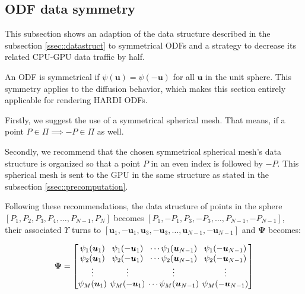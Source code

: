 \documentclass[twoside,twocolumn,10pt]{article}
\begin{document}
\subsection{ODF data symmetry}
\label{sssec::optimization}

This subsection shows an adaption of the data structure described in the subsection \ref{ssec::datastruct} to symmetrical ODFs and a strategy to decrease its related CPU-GPU data traffic by half.

An ODF is symmetrical if $\psi(\bm{u}) = \psi(-\bm{u})$ for all $\bm{u}$ in the unit sphere. This symmetry applies to the diffusion behavior, which makes this section entirely applicable for rendering HARDI ODFs.%

Firstly, we suggest the use of a symmetrical spherical mesh. That means, if a point $P \in \Pi \implies -P \in \Pi$ as well. %

Secondly, we recommend that the chosen symmetrical spherical mesh's data structure is organized so that a point $P$ in an even index is followed by $-P$. This spherical mesh is sent to the GPU in the same structure as stated in the subsection \ref{ssec::precomputation}.


Following these recommendations, the data structure of points in the sphere $[P_1, P_2, P_3, P_4, \dots, P_{N-1}, P_N]$ becomes $[P_1, -P_1, P_3, -P_3, \dots, P_{N-1}, -P_{N-1}]$, their associated $\Upsilon$ turns to $[\bm{u}_1, -\bm{u}_1, \bm{u}_3, -\bm{u}_3, \dots, \bm{u}_{N-1}, -\bm{u}_{N-1}]$ and $\bm{\Psi}$ becomes:

\begin{equation*}
\bm{\Psi} = 
\begingroup %
\setlength\arraycolsep{2pt}
\begin{bmatrix} 
    \psi_1(\bm{u}_1) & \psi_1(-\bm{u}_1) & \cdots \psi_1(\bm{u}_{N-1}) & \psi_1(-\bm{u}_{N-1})  \\
     \psi_2(\bm{u}_1)& \psi_2(-\bm{u}_1) & \cdots \psi_2(\bm{u}_{N-1}) & \psi_2(-\bm{u}_{N-1}) \\

    \vdots & \vdots & \vdots & \vdots  \\
     \psi_M(\bm{u}_1)&\psi_M(-\bm{u}_1) & \cdots \psi_M(\bm{u}_{N-1}) & \psi_M(-\bm{u}_{N-1})
\end{bmatrix}
\endgroup
\end{equation*}
\end{document}
